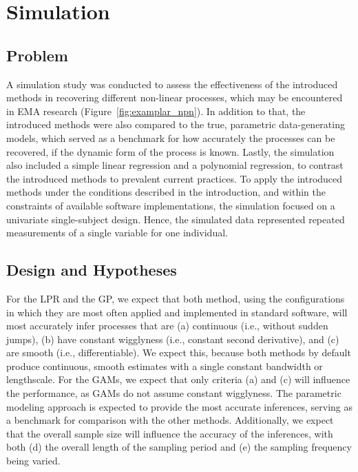 \documentclass[man, floatsintext]{apa7}
\begin{document}
\section{Simulation} \label{simulation}

\subsection{Problem}

A simulation study was conducted to assess the effectiveness of the introduced
methods in recovering different non-linear processes, which may be encountered
in EMA research (Figure~\ref{fig:examplar_npn}). In addition to that, the
introduced methods were also compared to the true, parametric data-generating
models, which served as a benchmark for how accurately the processes can be
recovered, if the dynamic form of the process is known. Lastly, the simulation
also included a simple linear regression and a polynomial regression, to
contrast the introduced methods to prevalent current practices. To apply the
introduced methods under the conditions described in the introduction, and
within the constraints of available software implementations, the simulation
focused on a univariate single-subject design. Hence, the simulated data
represented repeated measurements of a single variable for one individual.

\subsection{Design and Hypotheses}

For the LPR and the GP, we expect that both method, using the configurations
in which they are most often applied and implemented in standard software,
will most accurately infer processes that are (a) continuous
(i.e., without sudden jumps), (b) have constant wigglyness (i.e., constant
second derivative), and (c) are smooth (i.e., differentiable). We expect this,
because both methods by default produce continuous, smooth estimates with a
single constant bandwidth or lengthscale. For the GAMs, we expect that only
criteria (a) and (c) will influence the performance, as GAMs do not assume
constant wigglyness. The parametric modeling approach is expected to provide
the most accurate inferences, serving as a benchmark for comparison with the
other methods. Additionally, we expect that the overall sample size will
influence the accuracy of the inferences, with both (d) the overall length of
the sampling period and (e) the sampling frequency being varied.
\end{document}
